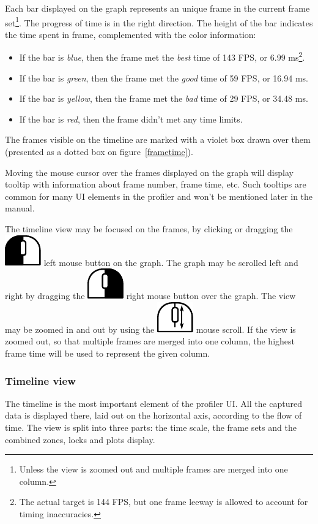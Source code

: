 \documentclass[hidelinks,titlepage,a4paper]{article}
\newcommand{\LMB}{\includegraphics[height=.8\baselineskip]{icons/lmb}}
\newcommand{\RMB}{\includegraphics[height=.8\baselineskip]{icons/rmb}}
\newcommand{\Scroll}{\includegraphics[height=.8\baselineskip]{icons/scroll}}
\begin{document}
Each bar displayed on the graph represents an unique frame in the current frame set\footnote{Unless the view is zoomed out and multiple frames are merged into one column.}. The progress of time is in the right direction. The height of the bar indicates the time spent in frame, complemented with the color information:

\begin{itemize}
\item If the bar is \emph{blue}, then the frame met the \emph{best} time of 143 FPS, or 6.99 \si{\milli\second}\footnote{The actual target is 144 FPS, but one frame leeway is allowed to account for timing inaccuracies.}.
\item If the bar is \emph{green}, then the frame met the \emph{good} time of 59 FPS, or 16.94 \si{\milli\second}.
\item If the bar is \emph{yellow}, then the frame met the \emph{bad} time of 29 FPS, or 34.48 \si{\milli\second}.
\item If the bar is \emph{red}, then the frame didn't met any time limits.
\end{itemize}

The frames visible on the timeline are marked with a violet box drawn over them (presented as a dotted box on figure~\ref{frametime}).

Moving the \faMousePointer{} mouse cursor over the frames displayed on the graph will display tooltip with information about frame number, frame time, etc. Such tooltips are common for many UI elements in the profiler and won't be mentioned later in the manual.

The timeline view may be focused on the frames, by clicking or dragging the \LMB{} left mouse button on the graph. The graph may be scrolled left and right by dragging the \RMB{} right mouse button over the graph. The view may be zoomed in and out by using the \Scroll{} mouse scroll. If the view is zoomed out, so that multiple frames are merged into one column, the highest frame time will be used to represent the given column.

\subsubsection{Timeline view}

The timeline is the most important element of the profiler UI. All the captured data is displayed there, laid out on the horizontal axis, according to the flow of time. The view is split into three parts: the time scale, the frame sets and the combined zones, locks and plots display.
\end{document}
